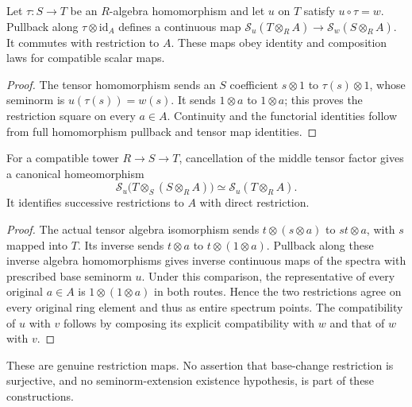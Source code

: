 \begin{theorem}
\label{spectrum:base-change-scalar-naturality}
\leanok
{}
Let $\tau:S\to T$ be an $R$-algebra homomorphism and let $u$ on $T$
satisfy $u\circ\tau=w$. Pullback along
$\tau\otimes\mathrm{id}_A$ defines a continuous map
$\mathcal S_u(T\otimes_R A)\to\mathcal S_w(S\otimes_R A)$.
It commutes with restriction to $A$. These maps obey identity and
composition laws for compatible scalar maps.
\end{theorem}
\begin{proof}
The tensor homomorphism sends an $S$ coefficient $s\otimes1$ to
$\tau(s)\otimes1$, whose seminorm is $u(\tau(s))=w(s)$.
It sends $1\otimes a$ to $1\otimes a$; this proves the restriction
square on every $a\in A$. Continuity and the functorial identities
follow from full homomorphism pullback and tensor map identities.
\end{proof}

\begin{theorem}
\label{spectrum:base-change-iteration}
\leanok
{}
For a compatible tower $R\to S\to T$, cancellation of the middle
tensor factor gives a canonical homeomorphism
\[
 \mathcal S_u\bigl(T\otimes_S(S\otimes_R A)\bigr)
 \simeq\mathcal S_u(T\otimes_R A).
\]
It identifies successive restrictions to $A$ with direct restriction.
\end{theorem}
\begin{proof}
The actual tensor algebra isomorphism sends
$t\otimes(s\otimes a)$ to $st\otimes a$, with $s$ mapped into $T$.
Its inverse sends $t\otimes a$ to $t\otimes(1\otimes a)$.
Pullback along these inverse algebra homomorphisms gives inverse
continuous maps of the spectra with prescribed base seminorm $u$.
Under this comparison, the representative of every original $a\in A$
is $1\otimes(1\otimes a)$ in both routes. Hence the two restrictions
agree on every original ring element and thus as entire spectrum points.
The compatibility of $u$ with $v$ follows by composing its explicit
compatibility with $w$ and that of $w$ with $v$.
\end{proof}

These are genuine restriction maps. No assertion that base-change
restriction is surjective, and no seminorm-extension existence
hypothesis, is part of these constructions.
